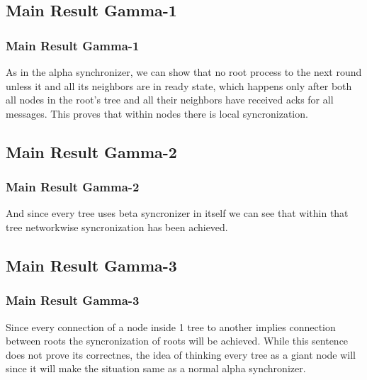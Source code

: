 \documentclass[11pt]{beamer}              %
\begin{document}
\subsection{Main Result Gamma-1}
\begin{frame}
	\frametitle{Main Result Gamma-1}
	As in the alpha synchronizer, we can show that no root process to the next round unless it and all its neighbors are in ready state, which happens only after both all nodes in the root's tree and all their neighbors have received acks for all messages. This proves that within nodes there is local syncronization.
\end{frame}

\subsection{Main Result Gamma-2}
\begin{frame}
	\frametitle{Main Result Gamma-2}
	And since every tree uses beta syncronizer in itself we can see that within that tree networkwise syncronization has been achieved.
	
\end{frame}

\subsection{Main Result Gamma-3}
\begin{frame}
	\frametitle{Main Result Gamma-3}
	Since every connection of a node inside 1 tree to another implies connection between roots the syncronization of roots will be achieved. While this sentence does not prove its correctnes, the idea of thinking every tree as a giant node will since it will make the situation same as a normal alpha synchronizer.
\end{frame}
\end{document}
